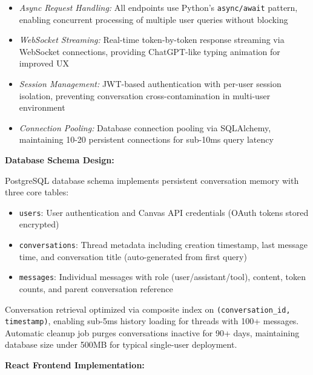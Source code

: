 \documentclass{article}
\begin{document}
\begin{itemize}

\item \textit{Async Request Handling:} All endpoints use Python's \texttt{async/await} pattern, enabling concurrent processing of multiple user queries without blocking

\item \textit{WebSocket Streaming:} Real-time token-by-token response streaming via WebSocket connections, providing ChatGPT-like typing animation for improved UX

\item \textit{Session Management:} JWT-based authentication with per-user session isolation, preventing conversation cross-contamination in multi-user environment

\item \textit{Connection Pooling:} Database connection pooling via SQLAlchemy, maintaining 10-20 persistent connections for sub-10ms query latency

\end{itemize}

\textbf{Database Schema Design:}

PostgreSQL database schema implements persistent conversation memory with three core tables:

\begin{itemize}

\item \texttt{users}: User authentication and Canvas API credentials (OAuth tokens stored encrypted)

\item \texttt{conversations}: Thread metadata including creation timestamp, last message time, and conversation title (auto-generated from first query)

\item \texttt{messages}: Individual messages with role (user/assistant/tool), content, token counts, and parent conversation reference

\end{itemize}

Conversation retrieval optimized via composite index on \texttt{(conversation\_id, timestamp)}, enabling sub-5ms history loading for threads with 100+ messages. Automatic cleanup job purges conversations inactive for 90+ days, maintaining database size under 500MB for typical single-user deployment.

\textbf{React Frontend Implementation:}
\end{document}
